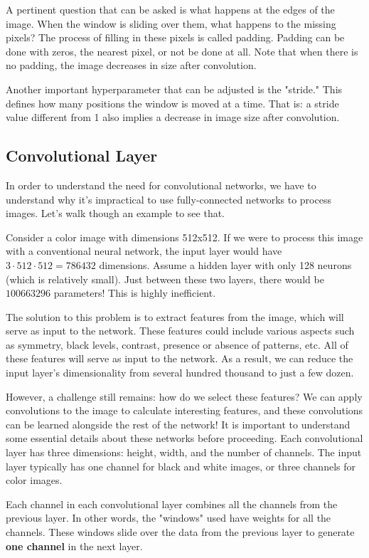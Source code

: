 A pertinent question that can be asked is what happens at the edges of the image. When the window is sliding over them, what happens to the missing pixels? The process of filling in these pixels is called padding. Padding can be done with zeros, the nearest pixel, or not be done at all. Note that when there is no padding, the image decreases in size after convolution.

Another important hyperparameter that can be adjusted is the "stride." This defines how many positions the window is moved at a time. That is: a stride value different from 1 also implies a decrease in image size after convolution.

\subsection{Convolutional Layer}

In order to understand the need for convolutional networks, we have to understand why it's impractical to use fully-connected networks to process images. Let's walk though an example to see that. 

Consider a color image with dimensions 512x512. If we were to process this image with a conventional neural network, the input layer would have \( 3 \cdot 512 \cdot 512 = 786432 \) dimensions. Assume a hidden layer with only 128 neurons (which is relatively small). Just between these two layers, there would be \( 100663296 \) parameters! This is highly inefficient.

The solution to this problem is to extract features from the image, which will serve as input to the network. These features could include various aspects such as symmetry, black levels, contrast, presence or absence of patterns, etc. All of these features will serve as input to the network. As a result, we can reduce the input layer's dimensionality from several hundred thousand to just a few dozen.


However, a challenge still remains: how do we select these features? We can apply convolutions to the image to calculate interesting features, and these convolutions can be learned alongside the rest of the network! It is important to understand some essential details about these networks before proceeding. Each convolutional layer has three dimensions: height, width, and the number of channels. The input layer typically has one channel for black and white images, or three channels for color images.

Each channel in each convolutional layer combines all the channels from the previous layer. In other words, the "windows" used have weights for all the channels. These windows slide over the data from the previous layer to generate \textbf{one channel} in the next layer.

